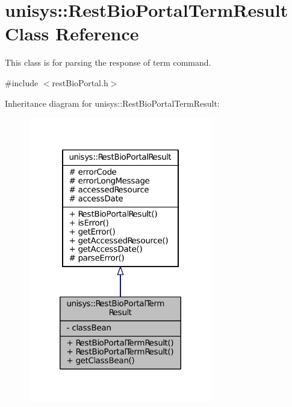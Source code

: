 \hypertarget{classunisys_1_1RestBioPortalTermResult}{\section{unisys\-:\-:Rest\-Bio\-Portal\-Term\-Result Class Reference}
\label{classunisys_1_1RestBioPortalTermResult}
}


This class is for parsing the response of term command.  




{\ttfamily \#include $<$rest\-Bio\-Portal.\-h$>$}



Inheritance diagram for unisys\-:\-:Rest\-Bio\-Portal\-Term\-Result\-:
\nopagebreak
\begin{figure}[H]
\begin{center}
\leavevmode
\includegraphics[width=228pt]{classunisys_1_1RestBioPortalTermResult__inherit__graph}
\end{center}
\end{figure}


